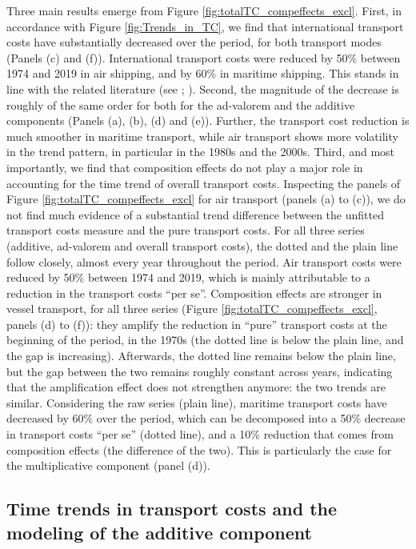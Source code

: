 \documentclass[a4paper,11pt]{article}
\begin{document}
Three main results emerge from Figure \ref{fig:totalTC_compeffects_excl}.
First, in accordance with Figure \ref{fig:Trends_in_TC}, we find that international transport costs have substantially decreased over the period, for both transport modes (Panels (c) and (f)).
International transport costs were reduced by 50\% between 1974 and 2019 in air shipping, and by 60\% in maritime shipping.
This stands in line with the related literature (see \citealp{Hummels_1999}; \citealp{Lafourcade_Thisse}).
Second, the magnitude of the decrease is roughly of the same order for both for the ad-valorem and the additive components (Panels (a), (b), (d) and (e)).
Further, the transport cost reduction is much smoother in maritime transport, while air transport shows more volatility in the trend pattern, in particular in the 1980s and the 2000s.
Third, and most importantly, we find that composition effects do not play a major role in accounting for the time trend of overall transport costs.
Inspecting the panels of Figure \ref{fig:totalTC_compeffects_excl} for air transport (panels (a) to (c)), we do not find much evidence of a substantial trend difference between the unfitted transport costs measure and the pure transport costs.
For all three series (additive, ad-valorem and overall transport costs), the dotted and the plain line follow closely, almost every year throughout the period.
Air transport costs were reduced by 50\% between 1974 and 2019, which is mainly attributable to a reduction in the transport costs ``per se''.
Composition effects are stronger in vessel transport, for all three series (Figure \ref{fig:totalTC_compeffects_excl}, panels (d) to (f)): they amplify the reduction in ``pure'' transport costs at the beginning of the period, in the 1970s (the dotted line is below the plain line, and the gap is increasing). Afterwards, the dotted line remains below the plain line, but the gap between the two remains roughly constant across years, indicating that the amplification effect does not strengthen anymore: the two trends are similar.
Considering the raw series (plain line), maritime transport costs have decreased by 60\% over the period, which can be decomposed into a 50\% decrease in transport costs ``per se'' (dotted line), and a 10\% reduction that comes from composition effects (the difference of the two).
This is particularly the case for the multiplicative component (panel (d)).\smallskip




\subsection{Time trends in transport costs and the modeling of the additive component}
\end{document}
